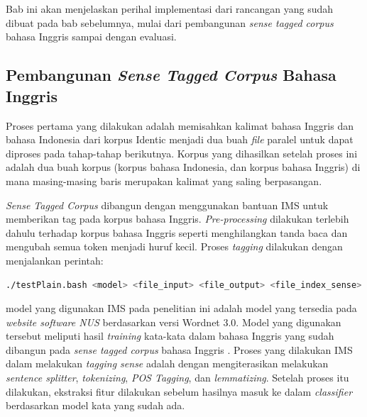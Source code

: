 \chapter{\babEmpat} \label{implementasi}
Bab ini akan menjelaskan perihal implementasi dari rancangan yang sudah dibuat pada bab sebelumnya, mulai dari pembangunan \textit{sense tagged corpus} bahasa Inggris sampai dengan evaluasi.

\section{Pembangunan \textit{Sense Tagged Corpus} Bahasa Inggris}
Proses pertama yang dilakukan adalah memisahkan kalimat bahasa Inggris dan bahasa Indonesia dari korpus Identic menjadi dua buah \textit{file} paralel untuk dapat diproses pada tahap-tahap berikutnya. Korpus yang dihasilkan setelah proses ini adalah dua buah korpus (korpus bahasa Indonesia, dan korpus bahasa Inggris) di mana masing-masing baris merupakan kalimat yang saling berpasangan.

\textit{Sense Tagged Corpus} dibangun dengan menggunakan bantuan IMS untuk memberikan tag pada korpus bahasa Inggris. \textit{Pre-processing} dilakukan terlebih dahulu terhadap korpus bahasa Inggris seperti menghilangkan tanda baca dan mengubah semua token menjadi huruf kecil. Proses \textit{tagging} dilakukan dengan menjalankan perintah:

\begin{lstlisting}[language=bash, caption={\textit{Tagging} korpus bahasa Inggris dengan IMS}, label={IMS}]
./testPlain.bash <model> <file_input> <file_output> <file_index_sense>
\end{lstlisting}

model yang digunakan IMS pada penelitian ini adalah model yang tersedia pada \textit{website software NUS} berdasarkan versi Wordnet 3.0. Model yang digunakan tersebut meliputi hasil \textit{training} kata-kata dalam bahasa Inggris yang sudah dibangun pada \textit{sense tagged corpus} bahasa Inggris \citep{taghipour2015one}. Proses yang dilakukan IMS dalam melakukan \textit{tagging sense} adalah dengan mengiterasikan melakukan \textit{sentence splitter}, \textit{tokenizing}, \textit{POS Tagging}, dan \textit{lemmatizing}. Setelah proses itu dilakukan, ekstraksi fitur dilakukan sebelum hasilnya masuk ke dalam \textit{classifier} berdasarkan model kata yang sudah ada. 


